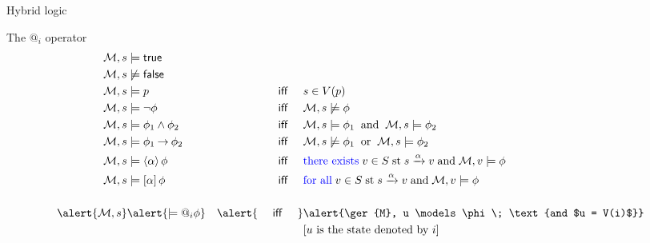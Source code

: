 \documentclass[aspectratio=169]{beamer}
\begin{document}
\begin{slide}{Hybrid logic}\label{s:48}
\small

\begin{block}{The $@_i$ operator}
\begin{align*}
\ger{M}, s & \models \true &&\\
\ger{M}, s & \not \models  \false &&\\
\ger{M}, s & \models  p &  \text{~~~ \textsf{iff} ~~~}  & s \in V(p)\\
\ger{M}, s  & \models \neg \phi  & \text{~~~ \textsf{iff} ~~~} & \ger{M}, s  \not \models \phi \\
\ger{M}, s & \models \phi_1 \land \phi_2  &\text{~~~ \textsf{iff} ~~~} & \ger{M}, s \models  \phi_1 \;\; \text{and}\;\;
                                                   \ger{M}, s \models  \phi_2 \\
\ger{M}, s & \models \phi_1 \impp \phi_2 & \text{~~~ \textsf{iff} ~~~} & \ger{M}, s \not \models \phi_1  \;\; \text{or}\;\; 
                                                  \ger{M}, s \models \phi_2 \\
\ger{M}, s  &\models \evm{\alpha}{\phi} & \text{ ~~~ \textsf{iff} ~~~} &
\text{\blue{there exists}}\; v \in S \;\text{st}\; s \xrightarrow{\alpha} v\; \text{and}\; \ger{M}, v \models \phi\\
\ger{M}, s & \models \alm{\alpha}{\phi} & \text{~~~ \textsf{iff} ~~~} &
\text{\blue{for all}}\; v \in S \; \text{st}\; s \xrightarrow{\alpha} v\; \text{and}\; \ger{M}, v \models \phi
\\[5mm]
\alert{\ger{M}, s} & \alert{\models  @_i \phi}
  &  \alert{\text{~~~ \textsf{iff} ~~~}}  & \alert{\ger{M}, u  \models \phi\; \text{and $u = V(i)$}}
  \\&&& \text{[$u$ is the state denoted by $i$]}
\end{align*}
\end{block}

\end{slide}
\end{document}
